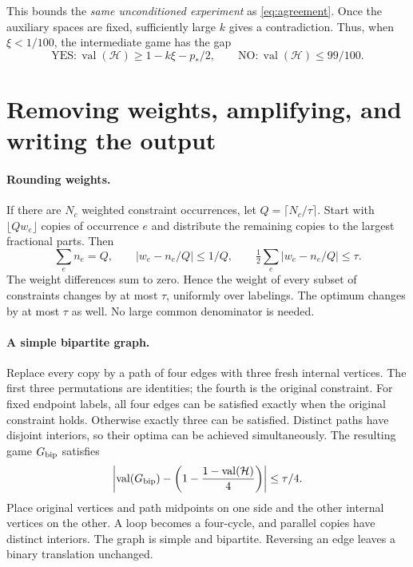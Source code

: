 \documentclass[11pt]{article}
\newcommand{\val}{\operatorname{val}}
\begin{document}
This bounds the \emph{same unconditioned experiment} as
\eqref{eq:agreement}. Once the auxiliary spaces are fixed, sufficiently
large $k$ gives a contradiction. Thus, when $\xi<1/100$, the intermediate
game has the gap
\begin{equation}\label{eq:intermediate-gap}
 \mathrm{YES}:\val(\mathcal H)\ge1-k\xi-p_*/2,
 \qquad \mathrm{NO}:\val(\mathcal H)\le99/100.
\end{equation}

\section{Removing weights, amplifying, and writing the output}\label{sec:finish}

\paragraph{Rounding weights.}
If there are $N_c$ weighted constraint occurrences, let $Q=\lceil N_c/\tau\rceil$.
Start with $\lfloor Qw_e\rfloor$ copies of occurrence $e$ and distribute
the remaining copies to the largest fractional parts. Then
\[
 \sum_e n_e=Q,\qquad |w_e-n_e/Q|\le1/Q,\qquad
 \tfrac12\sum_e|w_e-n_e/Q|\le\tau.
\]
The weight differences sum to zero. Hence the weight of every subset of
constraints changes by at most $\tau$, uniformly over labelings. The
optimum changes by at most $\tau$ as well. No large common denominator
is needed.

\paragraph{A simple bipartite graph.}
Replace every copy by a path of four edges with three fresh internal
vertices. The first three permutations are identities; the fourth is
the original constraint. For fixed endpoint labels, all four edges can
be satisfied exactly when the original constraint holds. Otherwise exactly
three can be satisfied. Distinct paths have disjoint interiors, so their
optima can be achieved simultaneously. The resulting game $G_{\rm bip}$ satisfies
\begin{equation}\label{eq:subdivision}
 \left|\val(G_{\rm bip})-\left(1-\frac{1-\val(\mathcal H)}4\right)\right|
 \le\tau/4.
\end{equation}
Place original vertices and path midpoints on one side and the other
internal vertices on the other. A loop becomes a four-cycle, and parallel
copies have distinct interiors. The graph is simple and bipartite.
Reversing an edge leaves a binary translation unchanged.
\end{document}
